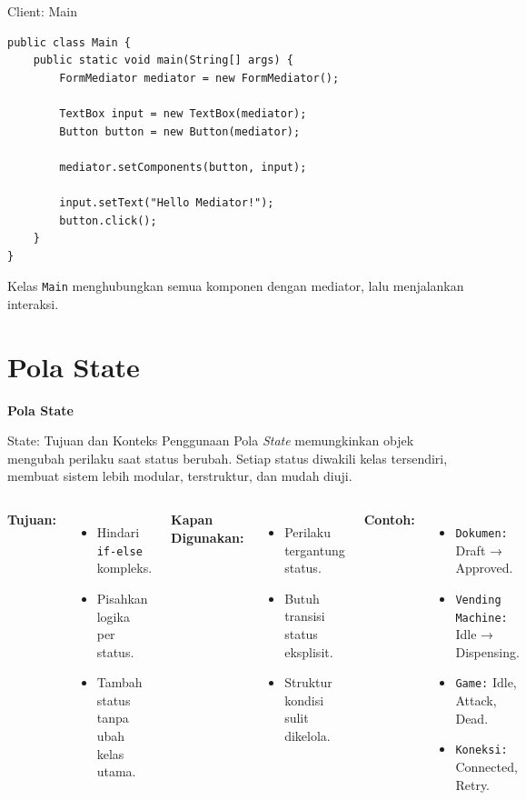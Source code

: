 \documentclass[aspectratio=169, table]{beamer}
\begin{document}
\begin{frame}[fragile]{Client: Main}
\begin{lstlisting}[style=JavaStyle]
public class Main {
	public static void main(String[] args) {
		FormMediator mediator = new FormMediator();
		
		TextBox input = new TextBox(mediator);
		Button button = new Button(mediator);
		
		mediator.setComponents(button, input);
		
		input.setText("Hello Mediator!");
		button.click();
	}
}
\end{lstlisting}

\small Kelas \texttt{Main} menghubungkan semua komponen dengan mediator, lalu menjalankan interaksi.
\end{frame}

\section{Pola State}
\begin{frame}{\hfill}
\centering
\textbf{\Huge{Pola State}}
\end{frame}

\begin{frame}{State: Tujuan dan Konteks Penggunaan}
	\vspace{6pt}
	Pola \textit{State} memungkinkan objek mengubah perilaku saat status berubah. Setiap status diwakili kelas tersendiri, membuat sistem lebih modular, terstruktur, dan mudah diuji.
	
	\vspace{6pt}
	\begin{columns}[T]
		\textbf{Tujuan:}
		\begin{itemize}
			\item Hindari \texttt{if-else} kompleks.
			\item Pisahkan logika per status.
			\item Tambah status tanpa ubah kelas utama.
		\end{itemize}
		
		\textbf{Kapan Digunakan:}
		\begin{itemize}
			\item Perilaku tergantung status.
			\item Butuh transisi status eksplisit.
			\item Struktur kondisi sulit dikelola.
		\end{itemize}
		
		\textbf{Contoh:}
		\begin{itemize}
			\item \texttt{Dokumen:} Draft → Approved.
			\item \texttt{Vending Machine:} Idle → Dispensing.
			\item \texttt{Game:} Idle, Attack, Dead.
			\item \texttt{Koneksi:} Connected, Retry.
		\end{itemize}
	\end{columns}
\end{frame}
\end{document}
